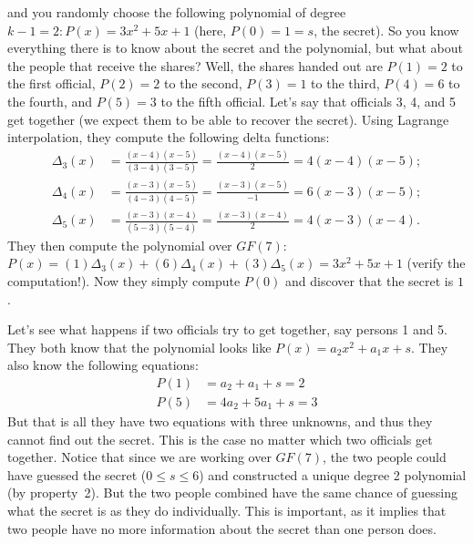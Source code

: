 \documentclass[11pt,fleqn]{article}
\begin{document}
and you randomly choose the following polynomial of degree 
$k-1 = 2: P(x) = 3x^2 + 5x + 1$ (here, $P(0) = 1 = s$, the secret). 
So you know everything there is
to know about the secret and the polynomial, but what about the people
that receive the shares? Well, the shares handed out are $P(1) =
2$ to the first official, $P(2) = 2$ to the second, $P(3) = 1$ to the third,
$P(4) = 6$ to the fourth, and $P(5) = 3$ to the fifth official. Let's say that officials
3, 4, and 5 get together (we expect them to be able to recover the
secret). Using Lagrange interpolation, they compute the following
delta functions:
\begin{align*}
\Delta_3(x) &= \frac{(x - 4)(x - 5)}{(3 - 4)(3 - 5)} = \frac{(x - 4)(x - 5)}{2} = 4(x-4)(x-5);\\
\Delta_4(x) &= \frac{(x - 3)(x - 5)}{(4 - 3)(4 - 5)} = \frac{(x - 3)(x - 5)}{-1} = 6(x-3)(x-5);\\
\Delta_5(x) &= \frac{(x - 3)(x - 4)}{(5 - 3)(5 - 4)} = \frac{(x - 3)(x - 4)}{2} = 4(x-3)(x-4).
\end{align*}
They then compute the polynomial over $GF(7)$: $P(x) =
(1)\Delta_3(x)+(6)\Delta_4(x)+(3)\Delta_5(x) = 3x^2+5x+1$ (verify the
computation!). Now they simply compute $P(0)$ and discover that the
secret is $1$.

Let's see what happens if two officials try to get together, say persons
1 and 5. They both know that the polynomial looks like $P(x) = a_2x^2 +
a_1x + s$. They also know the following equations:
\begin{align*}
P(1) &= a_2 + a_1 + s = 2\\
P(5) &= 4a_2 + 5a_1 + s = 3
\end{align*}
But that is all they have two equations with three unknowns, and thus they
cannot find out the secret.  This is the case no matter which two
officials get together. Notice that since we are working over $GF(7)$,
the two people could have guessed the secret ($0 \le s \le 6$) and
constructed a unique degree 2 polynomial (by property~2). But the two
people combined have the same chance of guessing what the secret is as
they do individually. This is important, as it implies that two people
have no more information about the secret than one person does.
\end{document}

